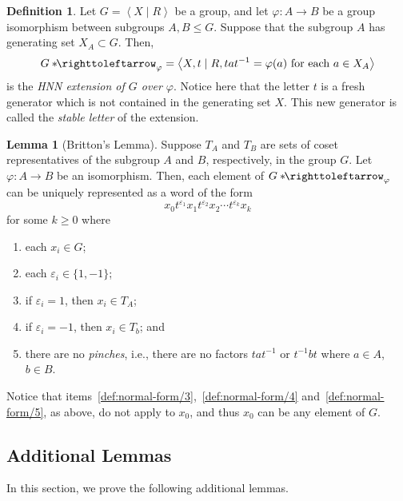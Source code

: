\documentclass[11pt,a4paper,reqno]{amsart}
\theoremstyle{plain}
\theoremstyle{definition}
\newtheorem{lemma}[theorem]{Lemma}
\newtheorem{definition}[theorem]{Definition}
\theoremstyle{definition}
\renewcommand\leq\leqslant
\renewcommand\geq\geqslant
\newcommand\hnn{*\!\!\righttoleftarrow}
\begin{document}
\begin{definition}\label{def:hnn-extension}
	Let $G = \left\langle X \mid R\right\rangle$ be a group, and let $\varphi\colon A\to B$ be a group isomorphism between subgroups $A,B\leq G$.
	Suppose that the subgroup $A$ has generating set $X_A \subset G$.
	Then,
	\[
		G\hnn_\varphi
		=
		\left\langle
		X, t
		\mid
		R, tat^{-1} = \varphi(a)\text{ for each } a\in X_A
		\right\rangle
	\]
	is the \emph{HNN extension of $G$ over $\varphi$}.
	Notice here that the letter $t$ is a fresh generator which is not contained in the generating set $X$.
	This new generator is called the \emph{stable letter} of the extension.
\end{definition}

\begin{lemma}[Britton's Lemma]\label{def:normal-form}
	Suppose $T_A$ and $T_B$ are sets of coset representatives of the subgroup $A$ and $B$, respectively, in the group $G$.
	Let $\varphi\colon A\to B$ be an isomorphism.
	Then, each element of $G\hnn_\varphi$ can be uniquely represented as a word of the form
	\begin{equation}\label{eq:normal-form}
		x_0 t^{\varepsilon_1} x_1 t^{\varepsilon_2} x_2 \cdots t^{\varepsilon_k} x_k
	\end{equation}
	for some $k\geq 0$ where
	\begin{enumerate}
		\item\label{def:normal-form/1} each $x_i \in G$;
		\item\label{def:normal-form/2} each $\varepsilon_i \in \{1,-1\}$;
		\item\label{def:normal-form/3} if $\varepsilon_i = 1$, then $x_i \in T_A$;
		\item\label{def:normal-form/4} if $\varepsilon_i = -1$, then $x_i \in T_b$; and
		\item\label{def:normal-form/5} there are no \emph{pinches}, i.e., there are no factors $tat^{-1}$ or $t^{-1}bt$ where $a\in A$, $b\in B$.
	\end{enumerate}
	Notice that items~\ref{def:normal-form/3},~\ref{def:normal-form/4} and~\ref{def:normal-form/5}, as above, do not apply to $x_0$, and thus $x_0$ can be any element of $G$.
\end{lemma}

\subsection{Additional Lemmas}

In this section, we prove the following additional lemmas.
\end{document}
